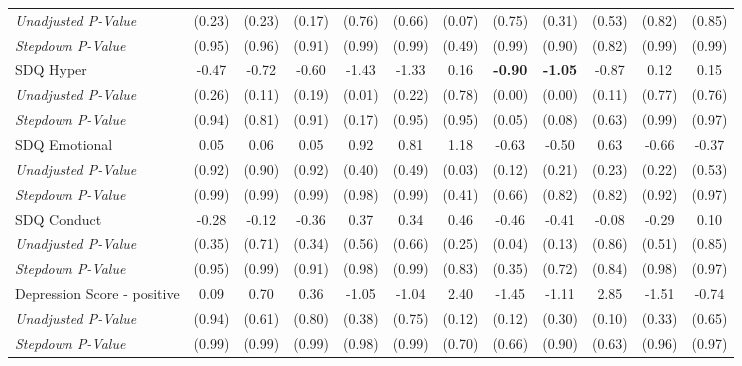 \begin{tabular}{l c c c c c c c c c c c}
\quad \textit{Unadjusted P-Value} & (0.23) & (0.23) & (0.17) & (0.76) & (0.66) & (0.07) & (0.75) & (0.31) & (0.53) & (0.82) & (0.85) \\
\quad \textit{Stepdown P-Value} & (0.95) & (0.96) & (0.91) & (0.99) & (0.99) & (0.49) & (0.99) & (0.90) & (0.82) & (0.99) & (0.99) \\
SDQ Hyper & -0.47 & -0.72 & -0.60 & -1.43 & -1.33 & 0.16 & \textbf{ -0.90 } & \textbf{ -1.05 } & -0.87 & 0.12 & 0.15 \\
\quad \textit{Unadjusted P-Value} & (0.26) & (0.11) & (0.19) & (0.01) & (0.22) & (0.78) & (0.00) & (0.00) & (0.11) & (0.77) & (0.76) \\
\quad \textit{Stepdown P-Value} & (0.94) & (0.81) & (0.91) & (0.17) & (0.95) & (0.95) & (0.05) & (0.08) & (0.63) & (0.99) & (0.97) \\
SDQ Emotional & 0.05 & 0.06 & 0.05 & 0.92 & 0.81 & 1.18 & -0.63 & -0.50 & 0.63 & -0.66 & -0.37 \\
\quad \textit{Unadjusted P-Value} & (0.92) & (0.90) & (0.92) & (0.40) & (0.49) & (0.03) & (0.12) & (0.21) & (0.23) & (0.22) & (0.53) \\
\quad \textit{Stepdown P-Value} & (0.99) & (0.99) & (0.99) & (0.98) & (0.99) & (0.41) & (0.66) & (0.82) & (0.82) & (0.92) & (0.97) \\
SDQ Conduct & -0.28 & -0.12 & -0.36 & 0.37 & 0.34 & 0.46 & -0.46 & -0.41 & -0.08 & -0.29 & 0.10 \\
\quad \textit{Unadjusted P-Value} & (0.35) & (0.71) & (0.34) & (0.56) & (0.66) & (0.25) & (0.04) & (0.13) & (0.86) & (0.51) & (0.85) \\
\quad \textit{Stepdown P-Value} & (0.95) & (0.99) & (0.91) & (0.98) & (0.99) & (0.83) & (0.35) & (0.72) & (0.84) & (0.98) & (0.97) \\
Depression Score - positive & 0.09 & 0.70 & 0.36 & -1.05 & -1.04 & 2.40 & -1.45 & -1.11 & 2.85 & -1.51 & -0.74 \\
\quad \textit{Unadjusted P-Value} & (0.94) & (0.61) & (0.80) & (0.38) & (0.75) & (0.12) & (0.12) & (0.30) & (0.10) & (0.33) & (0.65) \\
\quad \textit{Stepdown P-Value} & (0.99) & (0.99) & (0.99) & (0.98) & (0.99) & (0.70) & (0.66) & (0.90) & (0.63) & (0.96) & (0.97) \\
\bottomrule
\end{tabular}
